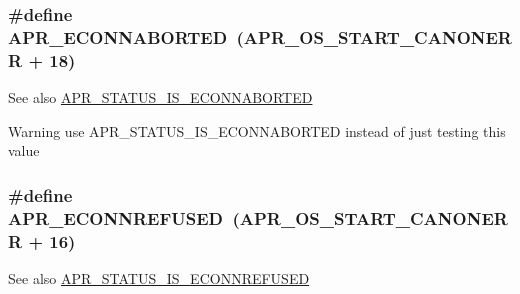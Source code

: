 \subsubsection[{\texorpdfstring{A\+P\+R\+\_\+\+E\+C\+O\+N\+N\+A\+B\+O\+R\+T\+ED}{APR_ECONNABORTED}}]{\setlength{\rightskip}{0pt plus 5cm}\#define A\+P\+R\+\_\+\+E\+C\+O\+N\+N\+A\+B\+O\+R\+T\+ED~({\bf A\+P\+R\+\_\+\+O\+S\+\_\+\+S\+T\+A\+R\+T\+\_\+\+C\+A\+N\+O\+N\+E\+RR} + 18)}\hypertarget{group__APR__Error_ga9458da18e0ee46a5d37c9cdfdc43efd2}{}\label{group__APR__Error_ga9458da18e0ee46a5d37c9cdfdc43efd2}
\begin{DoxySeeAlso}{See also}
\hyperlink{group__APR__STATUS__IS_ga528a8032b13c75fbdeb9bf7e4c0be493}{A\+P\+R\+\_\+\+S\+T\+A\+T\+U\+S\+\_\+\+I\+S\+\_\+\+E\+C\+O\+N\+N\+A\+B\+O\+R\+T\+ED} 
\end{DoxySeeAlso}
\begin{DoxyWarning}{Warning}
use A\+P\+R\+\_\+\+S\+T\+A\+T\+U\+S\+\_\+\+I\+S\+\_\+\+E\+C\+O\+N\+N\+A\+B\+O\+R\+T\+ED instead of just testing this value 
\end{DoxyWarning}
\subsubsection[{\texorpdfstring{A\+P\+R\+\_\+\+E\+C\+O\+N\+N\+R\+E\+F\+U\+S\+ED}{APR_ECONNREFUSED}}]{\setlength{\rightskip}{0pt plus 5cm}\#define A\+P\+R\+\_\+\+E\+C\+O\+N\+N\+R\+E\+F\+U\+S\+ED~({\bf A\+P\+R\+\_\+\+O\+S\+\_\+\+S\+T\+A\+R\+T\+\_\+\+C\+A\+N\+O\+N\+E\+RR} + 16)}\hypertarget{group__APR__Error_ga1b4d1d847bebdfc48af343bc2486ecb8}{}\label{group__APR__Error_ga1b4d1d847bebdfc48af343bc2486ecb8}
\begin{DoxySeeAlso}{See also}
\hyperlink{group__APR__STATUS__IS_ga4decf55c5cea9660a44fed0c74265ee6}{A\+P\+R\+\_\+\+S\+T\+A\+T\+U\+S\+\_\+\+I\+S\+\_\+\+E\+C\+O\+N\+N\+R\+E\+F\+U\+S\+ED} 
\end{DoxySeeAlso}
